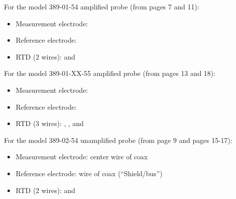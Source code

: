 \vskip 10pt

\noindent
For the model 389-01-54 amplified probe (from pages 7 and 11):

\begin{itemize}
\item{} Measurement electrode:  
\vskip 5pt
\item{} Reference electrode: 
\vskip 5pt
\item{} RTD (2 wires):  and 
\end{itemize}

\vskip 10pt

\noindent
For the model 389-01-XX-55 amplified probe (from pages 13 and 18):

\begin{itemize}
\item{} Measurement electrode:  
\vskip 5pt
\item{} Reference electrode: 
\vskip 5pt
\item{} RTD (3 wires): , , and 
\end{itemize}

\vskip 10pt

\noindent
For the model 389-02-54 unamplified probe (from page 9 and pages 15-17):

\begin{itemize}
\item{} Measurement electrode:  center wire of coax
\vskip 5pt
\item{} Reference electrode:  wire of coax (``Shield/bus'')
\vskip 5pt
\item{} RTD (2 wires):  and 
\end{itemize}





